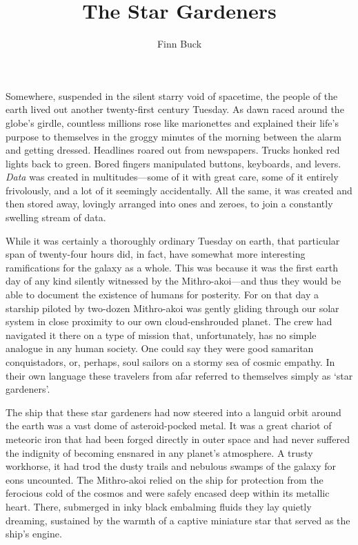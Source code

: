 \documentclass[12pt]{article}
\title{The Star Gardeners}
\author{Finn Buck}
\begin{document}
\maketitle

Somewhere,
suspended in the silent starry void of spacetime,
the people of the earth lived out another twenty-first century Tuesday.
As dawn raced around the globe's girdle,
countless millions rose like marionettes
and explained their life's purpose to themselves in the groggy minutes of the morning between the alarm and getting dressed.
Headlines roared out from newspapers.
Trucks honked red lights back to green.
Bored fingers manipulated buttons, keyboards, and levers.
\textit{Data} was created in multitudes---some of it with great care,
some of it entirely frivolously,
and a lot of it seemingly accidentally.
All the same, it was created and then stored away,
lovingly arranged into ones and zeroes, to join a constantly swelling stream of data.

While it was certainly a thoroughly ordinary Tuesday on earth,
that particular span of twenty-four hours did, in fact, have somewhat more interesting ramifications for the galaxy as a whole.
This was because it was the first earth day of any kind silently witnessed by the Mithro-akoi---and thus they would be able to document the existence of humans for posterity.
For on that day a starship piloted by two-dozen Mithro-akoi was gently gliding through our solar system in close proximity to our own cloud-enshrouded planet.
The crew had navigated it there on a type of mission that, unfortunately, has no simple analogue in any human society.
One could say they were good samaritan conquistadors,
or, perhaps, soul sailors on a stormy sea of cosmic empathy.
In their own language these travelers from afar referred to themselves simply as `star gardeners'.

The ship that these star gardeners had now steered into a languid orbit around the earth was a vast dome of asteroid-pocked metal.
It was a great chariot of meteoric iron that had been forged directly in outer space 
and had never suffered the indignity of becoming ensnared in any planet's atmosphere.
A trusty workhorse,
it had trod the dusty trails and nebulous swamps of the galaxy for eons uncounted.
The Mithro-akoi relied on the ship for protection from the ferocious cold of the cosmos and were safely encased deep within its metallic heart.
There,
submerged in inky black embalming fluids they lay quietly dreaming,
sustained by the warmth of a captive miniature star that served as the ship's engine.
\end{document}
